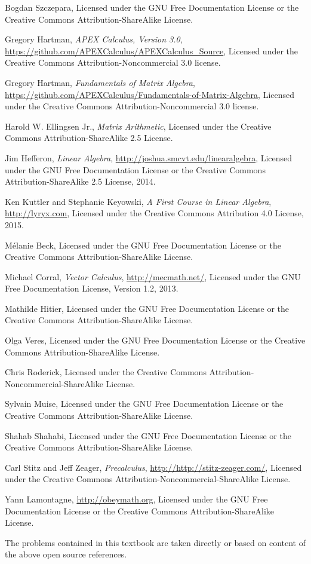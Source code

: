 \onecolumn


\begin{thebibliography}{9}
\label{label:authors}
Bogdan Szczepara,
Licensed under the GNU Free Documentation License or the
Creative Commons Attribution-ShareAlike License.

Gregory Hartman,
\emph{APEX Calculus, Version 3.0},
\url{https://github.com/APEXCalculus/APEXCalculus_Source},
Licensed under the
Creative Commons Attribution-Noncommercial 3.0 license.

Gregory Hartman,
\emph{Fundamentals of Matrix Algebra},
\url{https://github.com/APEXCalculus/Fundamentals-of-Matrix-Algebra},
Licensed under the 
Creative Commons Attribution-Noncommercial 3.0 license.

Harold W. Ellingsen Jr.,
\emph{Matrix Arithmetic},
Licensed under the
Creative Commons Attribution-ShareAlike 2.5 License.
 

Jim Hefferon,
\emph{Linear Algebra},
\url{http://joshua.smcvt.edu/linearalgebra},
Licensed under the GNU Free Documentation License or the 
Creative Commons Attribution-ShareAlike 2.5 License,
2014.

Ken Kuttler and Stephanie Keyowski,
\emph{A First Course in Linear Algebra},
\url{http://lyryx.com},
Licensed under the
Creative Commons Attribution 4.0 License,
2015.

M\'elanie Beck,
Licensed under the GNU Free Documentation License or the
Creative Commons Attribution-ShareAlike License.


Michael Corral,
\emph{Vector Calculus},
\url{http://mecmath.net/},
Licensed under the GNU Free Documentation License, Version 1.2, 2013.

Mathilde Hitier,
Licensed under the GNU Free Documentation License or the
Creative Commons Attribution-ShareAlike License.

Olga Veres,
Licensed under the GNU Free Documentation License or the
Creative Commons Attribution-ShareAlike License.

Chris Roderick,
Licensed under the
Creative Commons Attribution-Noncommercial-ShareAlike License.

Sylvain Muise,
Licensed under the GNU Free Documentation License or the
Creative Commons Attribution-ShareAlike License.

Shahab Shahabi,
Licensed under the GNU Free Documentation License or the
Creative Commons Attribution-ShareAlike License.

Carl Stitz and Jeff Zeager,
\emph{Precalculus},
\url{http://http://stitz-zeager.com/},
Licensed under the
Creative Commons Attribution-Noncommercial-ShareAlike License.

Yann Lamontagne,
\url{http://obeymath.org},
Licensed under the GNU Free Documentation License or the 
Creative Commons Attribution-ShareAlike License.

\end{thebibliography}
The problems contained in this textbook are taken directly or based on content of the above open source references.


